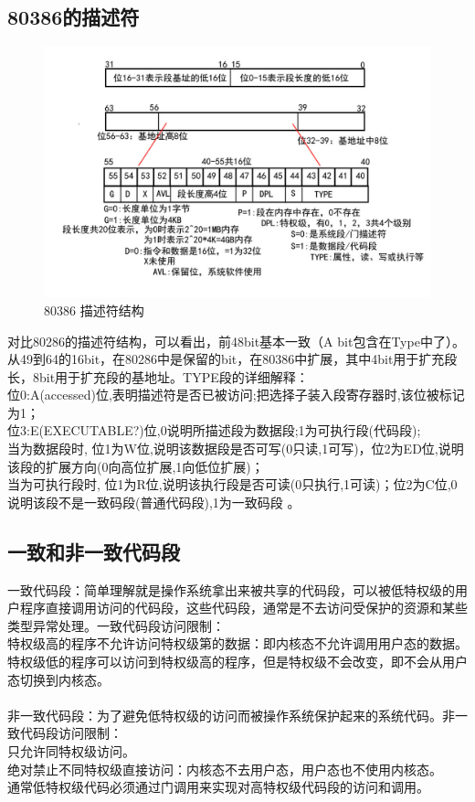 \documentclass[12pt]{article}
\begin{document}
\subsection{80386的描述符}
\begin{figure}[htbp]
\centering
\includegraphics[scale=0.4]{fig/25.jpeg}
\caption{80386 描述符结构}
\label{fig:80386 Segment Descriptor}
\end{figure}
对比80286的描述符结构，可以看出，前48bit基本一致（A bit包含在Type中了）。从49到64的16bit，在80286中是保留的bit，在80386中扩展，其中4bit用于扩充段长，8bit用于扩充段的基地址。TYPE段的详细解释：\\
位0:A(accessed)位,表明描述符是否已被访问;把选择子装入段寄存器时,该位被标记为1；\\
位3:E(EXECUTABLE?)位,0说明所描述段为数据段;1为可执行段(代码段);\\
当为数据段时, 位1为W位,说明该数据段是否可写(0只读,1可写)，位2为ED位,说明该段的扩展方向(0向高位扩展,1向低位扩展)；\\
当为可执行段时, 位1为R位,说明该执行段是否可读(0只执行,1可读)；位2为C位,0说明该段不是一致码段(普通代码段),1为一致码段 。
\subsection{一致和非一致代码段}
一致代码段：简单理解就是操作系统拿出来被共享的代码段，可以被低特权级的用户程序直接调用访问的代码段，这些代码段，通常是不去访问受保护的资源和某些类型异常处理。一致代码段访问限制：\\
特权级高的程序不允许访问特权级第的数据：即内核态不允许调用用户态的数据。\\
特权级低的程序可以访问到特权级高的程序，但是特权级不会改变，即不会从用户态切换到内核态。\\\\
非一致代码段：为了避免低特权级的访问而被操作系统保护起来的系统代码。非一致代码段访问限制：\\
只允许同特权级访问。\\
绝对禁止不同特权级直接访问：内核态不去用户态，用户态也不使用内核态。\\
通常低特权级代码必须通过门调用来实现对高特权级代码段的访问和调用。
\end{document}
